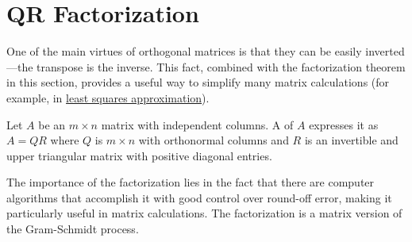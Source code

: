 \documentclass{ximera}
\begin{document}
\section*{QR Factorization}

    
One of the main virtues of orthogonal
matrices is that they can be easily inverted---the transpose is the
inverse. This fact, combined with the factorization theorem in this
section, provides a useful way to simplify many matrix calculations (for
    example, in \href{https://ximera.osu.edu/appliedlinearalgebra/c8ChapterEight/learningActivities/m8LearningActivities/svdRevisited/leastSquaresCurves}{least squares approximation}).
    
    
\begin{definition}\label{def:QR-factorization}
Let $A$ be an $m \times n$ matrix with independent columns. A  of $A$ expresses it as $A = QR$ where $Q$ is $m \times n$ with orthonormal columns and $R$ is an invertible and upper triangular matrix with positive diagonal entries.
\end{definition}
    
The importance of the factorization
lies in the fact that there are computer algorithms that accomplish it
with good control over round-off error, making it particularly useful in
matrix calculations. The factorization is a matrix version of the Gram-Schmidt process.
    
\end{document}
